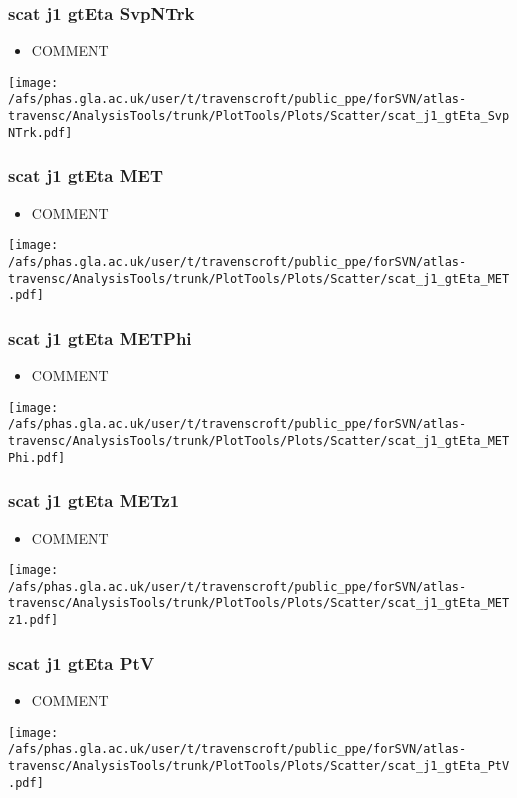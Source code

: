 \documentclass{beamer}
\begin{document}
\begin{frame}
\frametitle{scat j1 gtEta SvpNTrk}
\begin{itemize}
\item COMMENT
\end{itemize}
\begin{center}
\texttt{[image: /afs/phas.gla.ac.uk/user/t/travenscroft/public\_ppe/forSVN/atlas-travensc/AnalysisTools/trunk/PlotTools/Plots/Scatter/scat\_j1\_gtEta\_SvpNTrk.pdf]}
\end{center}
\end{frame}

\begin{frame}
\frametitle{scat j1 gtEta MET}
\begin{itemize}
\item COMMENT
\end{itemize}
\begin{center}
\texttt{[image: /afs/phas.gla.ac.uk/user/t/travenscroft/public\_ppe/forSVN/atlas-travensc/AnalysisTools/trunk/PlotTools/Plots/Scatter/scat\_j1\_gtEta\_MET.pdf]}
\end{center}
\end{frame}

\begin{frame}
\frametitle{scat j1 gtEta METPhi}
\begin{itemize}
\item COMMENT
\end{itemize}
\begin{center}
\texttt{[image: /afs/phas.gla.ac.uk/user/t/travenscroft/public\_ppe/forSVN/atlas-travensc/AnalysisTools/trunk/PlotTools/Plots/Scatter/scat\_j1\_gtEta\_METPhi.pdf]}
\end{center}
\end{frame}

\begin{frame}
\frametitle{scat j1 gtEta METz1}
\begin{itemize}
\item COMMENT
\end{itemize}
\begin{center}
\texttt{[image: /afs/phas.gla.ac.uk/user/t/travenscroft/public\_ppe/forSVN/atlas-travensc/AnalysisTools/trunk/PlotTools/Plots/Scatter/scat\_j1\_gtEta\_METz1.pdf]}
\end{center}
\end{frame}

\begin{frame}
\frametitle{scat j1 gtEta PtV}
\begin{itemize}
\item COMMENT
\end{itemize}
\begin{center}
\texttt{[image: /afs/phas.gla.ac.uk/user/t/travenscroft/public\_ppe/forSVN/atlas-travensc/AnalysisTools/trunk/PlotTools/Plots/Scatter/scat\_j1\_gtEta\_PtV.pdf]}
\end{center}
\end{frame}
\end{document}
